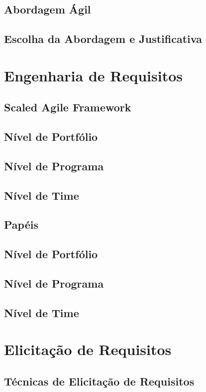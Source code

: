 \section{Abordagem Ágil}
\section{Escolha da Abordagem e Justificativa}

\chapter[Engenharia de Requisitos]{Engenharia de Requisitos}

\section{Scaled Agile Framework}
\section{Nível de Portfólio}
\section{Nível de Programa}
\section{Nível de Time}

\section{Papéis}
\section{Nível de Portfólio}
\section{Nível de Programa}
\section{Nível de Time}

\chapter[Elicitação de Requisitos]{Elicitação de Requisitos}
\section{Técnicas de Elicitação de Requisitos}

